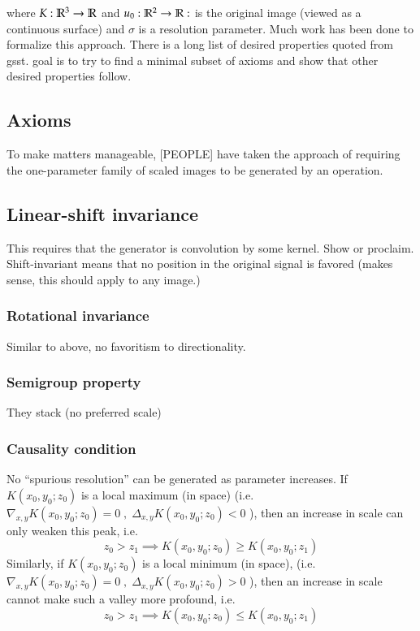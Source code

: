 	where $K: \mathbb{R}^3 \to \mathbb{R} $ and  $u_0: \mathbb{R}^2 \to \mathbb{R}: $ is the original image (viewed as a continuous surface) and $\sigma$ is a resolution parameter.
Much work has been done to formalize this approach. There is a long list of desired properties
quoted from gsst. goal is to try to find a minimal subset of axioms and show that other desired properties follow.


\subsection{Axioms}
To make matters manageable, [PEOPLE] have taken the approach of requiring the one-parameter family of scaled images to be generated by an operation.

\subsection{Linear-shift invariance}
	This requires that the generator is convolution by some kernel. Show or proclaim.
	Shift-invariant means that no position in the original signal is favored (makes sense, this should apply to any image.)

\subsubsection{Rotational invariance}
	Similar to above, no favoritism to directionality.

\subsubsection{Semigroup property}
	They stack (no preferred scale)

\subsubsection{Causality condition}
	No ``spurious resolution'' can be generated as parameter increases. 
	If $K(x_0,y_0;z_0)$ is a local maximum (in space)
		(i.e. $\nabla_{x,y}K(x_0,y_0; z_0) = 0 \;,\; \Delta_{x,y} K(x_0,y_0;z_0) < 0$ ),
		then an increase in scale can only weaken this peak, i.e.
		\begin{equation}
		z_0 > z_1 \implies K(x_0,y_0;z_0) \ge K(x_0,y_0;z_1)
		\end{equation}
	Similarly, if $K(x_0,y_0;z_0)$ is a local minimum (in space), (i.e. $\nabla_{x,y}K(x_0,y_0; z_0) = 0 \;,\; \Delta_{x,y} K(x_0,y_0;z_0) > 0$ ),
	then an increase in scale cannot make such a valley more profound, i.e.
	\begin{equation}
	z_0 > z_1 \implies K(x_0,y_0;z_0) \le K(x_0,y_0;z_1)
	\end{equation}

